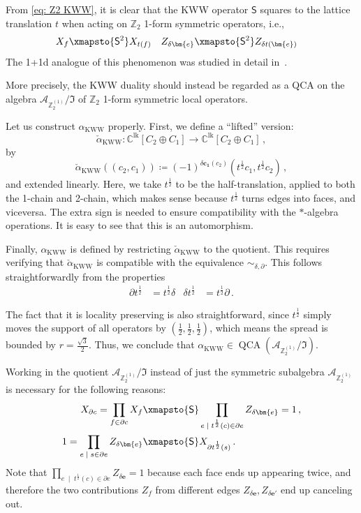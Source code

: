\documentclass[aps,twocolumn,prx,floatfix,preprintnumbers, nofootinbib,10pt]{revtex4-2}
\numberwithin{equation}{section}
\theoremstyle{definition}
\theoremstyle{remark}
\theoremstyle{claim}
\newcommand{\be}{\begin{equation}}
\newcommand{\ee}{\end{equation}}
\newcommand{\Z}{{\mathbb Z}}
\newcommand{\mc}[1]{\mathcal{#1}}
\renewcommand{\sf}[1]{\mathsf{#1}}
\begin{document}
From \eqref{eq: Z2 KWW}, it is clear that the KWW operator $\sf{S}$ squares to the lattice translation $t$ when acting on $\mathbb{Z}_2$ 1-form symmetric operators, i.e.,
\begin{align}\label{eq:S2action}
 X_f &\xmapsto{\sf{S}^2} X_{t(f)} & Z_{\delta \bm{e}} &\xmapsto{\sf{S}^2} Z_{\delta t (\bm{e})}
\end{align}
The 1+1d analogue of this phenomenon was studied in detail in~\cite{Seiberg:2023cdc, Seiberg:2024gek}.

More precisely, the KWW duality should instead be regarded as a QCA on the algebra $\mc{A}_{\Z_2^{(1)}} / \mathfrak{I}$ of $\mathbb{Z}_2$ 1-form symmetric local operators.

Let us construct $\alpha_\text{KWW}$ properly. First, we define a ``lifted'' version:
\be
\check{\alpha}_\text{KWW} : \mathbb{C}^{\text{lk}}[C_2 \oplus C_1] \rightarrow \mathbb{C}^{\text{lk}}[C_2 \oplus C_1] \,,
\ee
by
\be
\check{\alpha}_\text{KWW}((c_2, c_1)) \coloneqq (-1)^{\delta \bm{c_1} (c_2)} \left(t^\frac{1}{2} c_1, t^\frac{1}{2} c_2 \right) \,,
\ee
and extended linearly.
Here, we take $t^\frac{1}{2}$ to be the half-translation, applied to both the 1-chain and 2-chain, which makes sense because $t^\frac{1}{2}$ turns edges into faces, and viceversa. The extra sign is needed to ensure compatibility with the $*$-algebra operations.
It is easy to see that this is an automorphism.

Finally, $\alpha_\text{KWW}$ is defined by restricting $\check{\alpha}_\text{KWW}$ to the quotient. This requires verifying that $\check{\alpha}_\text{KWW}$ is compatible with the equivalence $\sim_{\delta, \partial}$. This follows straightforwardly from the properties
\begin{align}
 \partial t^\frac{1}{2} &= t^\frac{1}{2} \delta & \delta t^\frac{1}{2} &= t^\frac{1}{2} \partial \,.
\end{align}

The fact that it is locality preserving is also straightforward, since $t^\frac{1}{2}$ simply moves the support of all operators by $(\frac{1}{2}, \frac{1}{2}, \frac{1}{2})$, which means the spread is bounded by $r = \frac{\sqrt{3}}{2}$.
Thus, we conclude that $\alpha_{\text{KWW}} \in \operatorname{QCA}(\mc{A}_{\Z_2^{(1)}} / \mathfrak{I})$.

Working in the quotient $\mc{A}_{\Z_2^{(1)}} / \mathfrak{I}$ instead of just the symmetric subalgebra $\mc{A}_{\Z_2^{(1)}}$ is necessary for the following reasons:
\begin{align}
 X_{\partial c} = \prod_{f \in \partial c} X_f&\xmapsto{\sf{S}} \prod_{e \; \mid \; t^\frac{1}{2} (c) \in \partial e} Z_{\delta \bm{e}} = 1 \,, \\
 1 = \prod_{e \; \mid \; s \in \partial e} Z_{\delta \bm{e}} &\xmapsto{\sf{S}} X_{\partial t^\frac{1}{2}(s)} \,.
\end{align}
Note that $\prod_{e \; \mid \; t^\frac{1}{2} (c) \in \partial e} Z_{\delta \bm{e}} = 1$ because each face ends up appearing twice, and therefore the two contributions $Z_f$ from different edges $Z_{\delta \bm{e}}, Z_{\delta \bm{e'}}$ end up canceling out.
\end{document}
